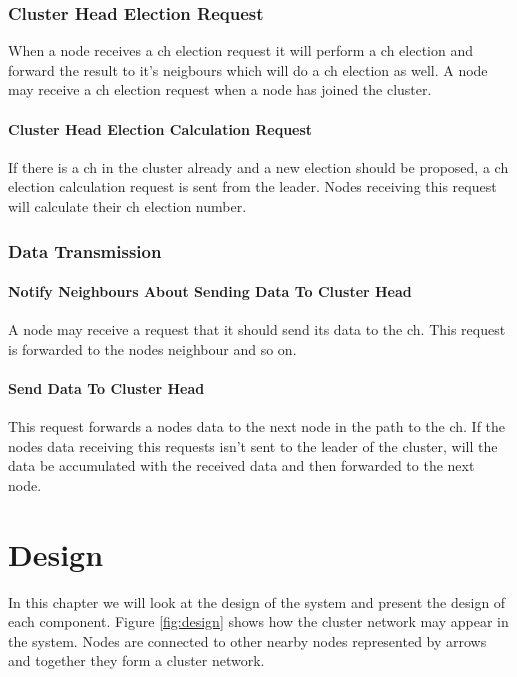 \documentclass[USenglish]{uit-thesis}
\begin{document}
\subsection{Cluster Head Election Request}
When a node receives a \gls{ch} election request it will perform a \gls{ch} election and forward the result to it's neigbours which will do a \gls{ch} election as well.
A node may receive a \gls{ch} election request when a node has joined the cluster.

\subsubsection{Cluster Head Election Calculation Request}
If there is a \gls{ch} in the cluster already and a new election should be proposed, a \gls{ch} election calculation request is sent from the leader. Nodes receiving this request will calculate their \gls{ch} election number. %

\subsection{Data Transmission}
\subsubsection{Notify Neighbours About Sending Data To Cluster Head}
A node may receive a request that it should send its data to the \gls{ch}. This request is forwarded to the nodes neighbour and so on.

\subsubsection{Send Data To Cluster Head}
This request forwards a nodes data to the next node in the path to the \gls{ch}. If the nodes data receiving this requests isn't sent to the leader of the cluster, will the data be accumulated with the received data and then forwarded to the next node.



\chapter{Design}
In this chapter we will look at the design of the system and present the design of each component. Figure \ref{fig:design} shows how the cluster network may appear in the system. Nodes are connected to other nearby nodes represented by arrows and together they form a cluster network.
\end{document}
